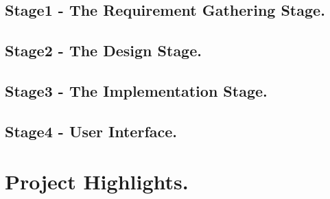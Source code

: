 \documentclass[10pt,conference]{IEEEtran}
\begin{document}
\subsection{Stage1 - The Requirement Gathering Stage. }\label{sec:1 Requirement Gathering Stage. }


\subsection{Stage2 - The Design Stage. }\label{sec: 2:The Design Stage.}


\subsection{Stage3 - The Implementation Stage. }\label{sec: 3 The Implementation Stage.}


\subsection{Stage4 -	User Interface. }\label{sec: 4. User Interface.}


\section{Project Highlights.}\label{sec:7. Project Highlights.}




%
%
\end{document}
